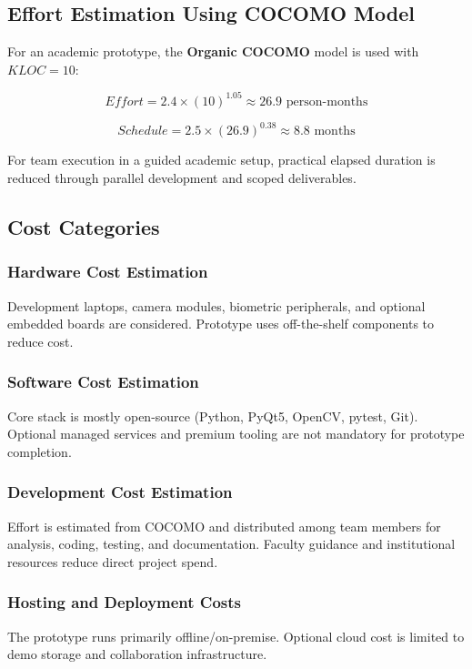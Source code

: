 \subsection{Effort Estimation Using COCOMO Model}
For an academic prototype, the \textbf{Organic COCOMO} model is used with $KLOC = 10$:

$$
Effort = 2.4 \times (10)^{1.05} \approx 26.9 \text{ person-months}
$$

$$
Schedule = 2.5 \times (26.9)^{0.38} \approx 8.8 \text{ months}
$$

For team execution in a guided academic setup, practical elapsed duration is reduced through parallel development and scoped deliverables.

\subsection{Cost Categories}

\subsubsection{Hardware Cost Estimation}
Development laptops, camera modules, biometric peripherals, and optional embedded boards are considered. Prototype uses off-the-shelf components to reduce cost.

\subsubsection{Software Cost Estimation}
Core stack is mostly open-source (Python, PyQt5, OpenCV, pytest, Git). Optional managed services and premium tooling are not mandatory for prototype completion.

\subsubsection{Development Cost Estimation}
Effort is estimated from COCOMO and distributed among team members for analysis, coding, testing, and documentation. Faculty guidance and institutional resources reduce direct project spend.

\subsubsection{Hosting and Deployment Costs}
The prototype runs primarily offline/on-premise. Optional cloud cost is limited to demo storage and collaboration infrastructure.

